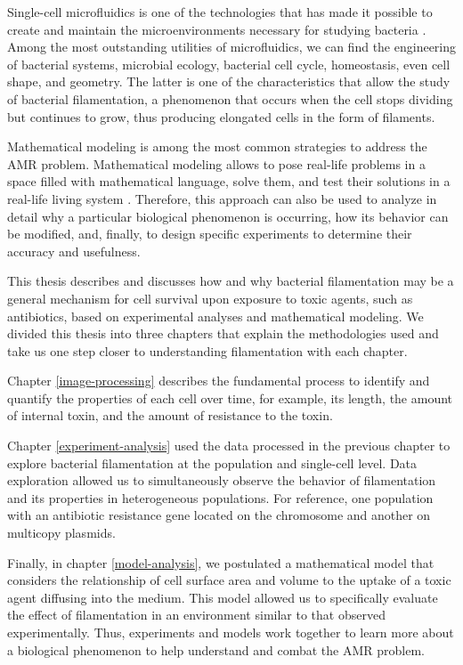 \documentclass[
  12pt,
  a4paper,
  oneside]{krantz}
\begin{document}
Single-cell microfluidics is one of the technologies that has made it
possible to create and maintain the microenvironments necessary for
studying bacteria \citep{yin2012}. Among the most outstanding utilities of
microfluidics, we can find the engineering of bacterial systems,
microbial ecology, bacterial cell cycle, homeostasis, even cell shape,
and geometry. The latter is one of the characteristics that allow the
study of bacterial filamentation, a phenomenon that occurs when the cell
stops dividing but continues to grow, thus producing elongated cells in
the form of filaments.

Mathematical modeling is among the most common strategies to address the
AMR problem. Mathematical modeling allows to pose real-life problems in
a space filled with mathematical language, solve them, and test their
solutions in a real-life living system \citep{verschaffel2002}. Therefore,
this approach can also be used to analyze in detail why a particular
biological phenomenon is occurring, how its behavior can be modified,
and, finally, to design specific experiments to determine their accuracy
and usefulness.

This thesis describes and discusses how and why bacterial filamentation
may be a general mechanism for cell survival upon exposure to toxic
agents, such as antibiotics, based on experimental analyses and
mathematical modeling. We divided this thesis into three chapters that
explain the methodologies used and take us one step closer to
understanding filamentation with each chapter.

Chapter \ref{image-processing} describes the fundamental process to
identify and quantify the properties of each cell over time, for
example, its length, the amount of internal toxin, and the amount of
resistance to the toxin.

Chapter \ref{experiment-analysis} used the data processed in the
previous chapter to explore bacterial filamentation at the population
and single-cell level. Data exploration allowed us to simultaneously
observe the behavior of filamentation and its properties in
heterogeneous populations. For reference, one population with an
antibiotic resistance gene located on the chromosome and another on
multicopy plasmids.

Finally, in chapter \ref{model-analysis}, we postulated a mathematical
model that considers the relationship of cell surface area and volume to
the uptake of a toxic agent diffusing into the medium. This model
allowed us to specifically evaluate the effect of filamentation in an
environment similar to that observed experimentally. Thus, experiments
and models work together to learn more about a biological phenomenon to
help understand and combat the AMR problem.
\end{document}
